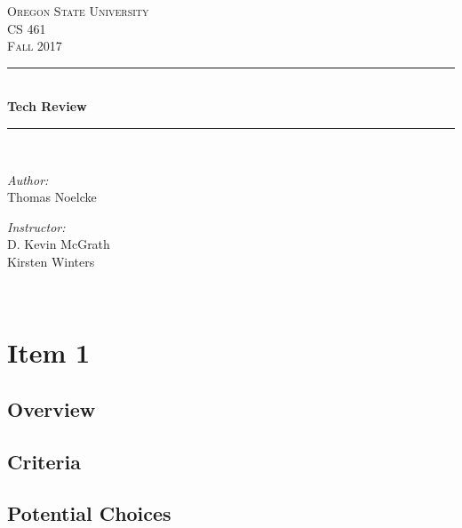 \documentclass[letterpaper,10pt]{article}
\begin{document}
    \begin{titlepage}
    \newcommand{\HRule}{\rule{\linewidth}{0.5mm}}
    \center
    \textsc{\Large Oregon State University}\\[1.5cm]
    \textsc{\Large CS 461}\\[0.5cm]
    \textsc{\Large Fall 2017}\\[0.5cm]
    \HRule \\[0.4cm]
    { \huge \bfseries Tech Review}\\[0.4cm] %
    \HRule \\[1.5cm]
    \begin{minipage}{0.4\textwidth}
        \begin{flushleft} \large
        \emph{Author:}\\
        Thomas Noelcke
        \end{flushleft}
    \end{minipage}
    \begin{minipage}{0.4\textwidth}
        \begin{flushright} \large
        \emph{Instructor:} \\
        D. Kevin McGrath\\
        Kirsten Winters
        \end{flushright}
    \end{minipage}\\[2cm]
    \begin{abstract}
    \item 

    \end{abstract}
    \vfill %
    \end{titlepage}
		
\section{Item 1}
	\subsection{Overview}
	
	\subsection{Criteria}
	
	\subsection{Potential Choices}
\end{document}
